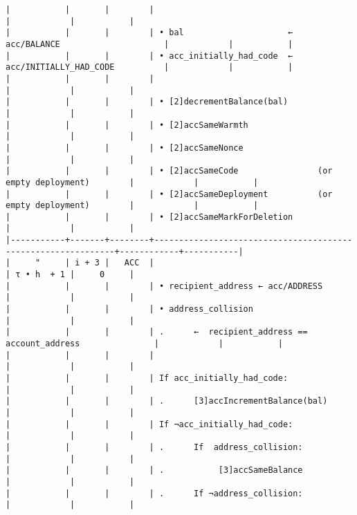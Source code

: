 \documentclass[varwidth=\maxdimen,margin=0.5cm,multi={verbatim}]{standalone}
\begin{document}
\begin{verbatim}
|           |       |        |                                                              |            |           |
|           |       |        | • bal                     ←  acc/BALANCE                     |            |           |
|           |       |        | • acc_initially_had_code  ←  acc/INITIALLY_HAD_CODE          |            |           |
|           |       |        |                                                              |            |           |
|           |       |        | • [2]decrementBalance(bal)                                   |            |           |
|           |       |        | • [2]accSameWarmth                                           |            |           |
|           |       |        | • [2]accSameNonce                                            |            |           |
|           |       |        | • [2]accSameCode                (or empty deployment)        |            |           |
|           |       |        | • [2]accSameDeployment          (or empty deployment)        |            |           |
|           |       |        | • [2]accSameMarkForDeletion                                  |            |           |
|-----------+-------+--------+--------------------------------------------------------------+------------+-----------|
|     "     | i + 3 |   ACC  |                                                              | τ • h  + 1 |     0     |
|           |       |        | • recipient_address ← acc/ADDRESS                            |            |           |
|           |       |        | • address_collision                                          |            |           |
|           |       |        | .      ←  recipient_address == account_address               |            |           |
|           |       |        |                                                              |            |           |
|           |       |        | If acc_initially_had_code:                                   |            |           |
|           |       |        | .      [3]accIncrementBalance(bal)                           |            |           |
|           |       |        | If ¬acc_initially_had_code:                                  |            |           |
|           |       |        | .      If  address_collision:                                |            |           |
|           |       |        | .           [3]accSameBalance                                |            |           |
|           |       |        | .      If ¬address_collision:                                |            |           |

\end{verbatim}
\end{document}
